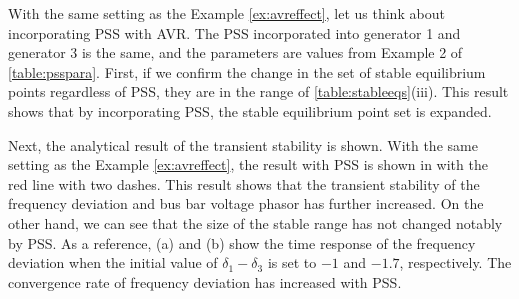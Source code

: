 \documentclass[tombow,dvipdfmx]{corona-a5-1.1}
\begin{document}
\begin{例}\label{ex:psseffect}
With the same setting as the Example \ref{ex:avreffect}, let us think about incorporating PSS with AVR.
The PSS incorporated into generator 1 and generator 3 is the same, and the parameters are values from Example 2 of \ref{table:psspara}.
First, if we confirm the change in the set of stable equilibrium points regardless of PSS, they are in the range of \ref{table:stableeqs}(iii).
This result shows that by incorporating PSS, the stable equilibrium point set is expanded.

Next, the analytical result of the transient stability is shown.
With the same setting as the Example \ref{ex:avreffect}, the result with PSS is shown in  with the red line with two dashes.
This result shows that the transient stability of the frequency deviation and bus bar voltage phasor has further increased.
On the other hand, we can see that the size of the stable range has not changed notably by PSS.
As a reference,  (a) and (b) show the time response of the frequency deviation when the initial value of $\delta_1-\delta_3$ is set to $-1$ and $-1.
7$, respectively.
The convergence rate of frequency deviation has increased with PSS.
\end{例}
\end{document}
